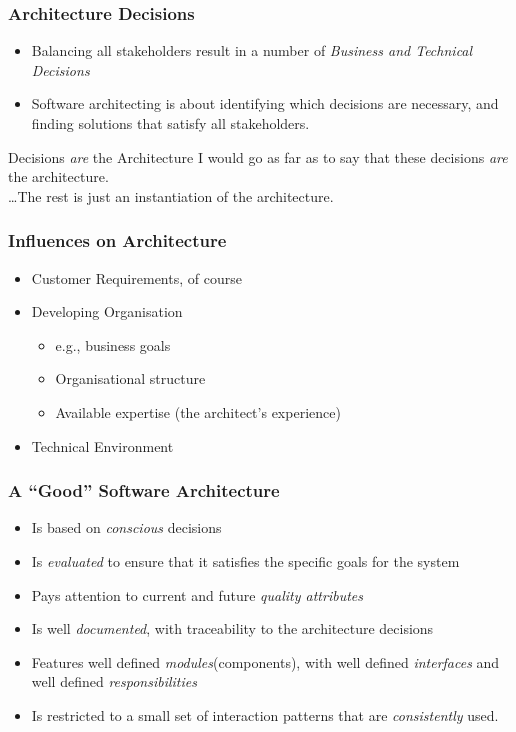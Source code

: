 \documentclass[10pt]{beamer}
\begin{document}
\begin{frame}[t]
\frametitle{Architecture Decisions}

\begin{itemize}
\item Balancing all stakeholders result in a number of \emph{Business and Technical Decisions}
\item Software architecting is about identifying which decisions are necessary, and finding solutions that satisfy all stakeholders.
\end{itemize}

\begin{block}{Decisions \emph{are} the Architecture}
I would go as far as to say that these decisions \emph{are} the architecture.\\
\ldots The rest is just an instantiation of the architecture.
\end{block}
\end{frame}

\begin{frame}[t]
\frametitle{Influences on Architecture}

\begin{itemize}
\item Customer Requirements, of course
\item Developing Organisation
\begin{itemize}
\item e.g., business goals
\item Organisational structure
\item Available expertise (the architect's experience)
\end{itemize}
\item Technical Environment
\end{itemize}
\end{frame}

\begin{frame}[t]
\frametitle{A ``Good'' Software Architecture}

\begin{itemize}
\item Is based on \emph{conscious} decisions
\item Is \emph{evaluated} to ensure that it satisfies the specific goals for the system
\item Pays attention to current and future \emph{quality attributes}
\item Is well \emph{documented}, with traceability to the architecture decisions
\item Features well defined \emph{modules}(components), with well defined \emph{interfaces} and well defined \emph{responsibilities}
\item Is restricted to a small set of interaction patterns that are \emph{consistently} used.
\end{itemize}
\end{frame}
\end{document}
